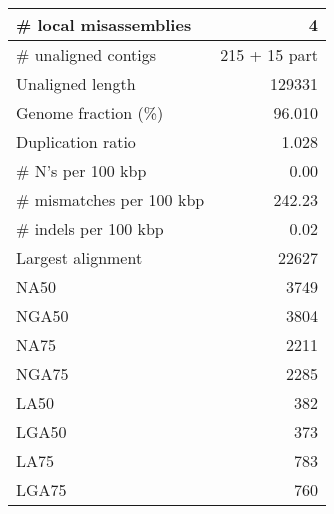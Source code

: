 \documentclass[12pt,a4paper]{article}
\begin{document}
\begin{table}[ht]
\begin{center}
\begin{tabular}{|l*{1}{|r}|}
\# local misassemblies & 4 \\ \hline
\# unaligned contigs & 215 + 15 part \\ \hline
Unaligned length & 129331 \\ \hline
Genome fraction (\%) & 96.010 \\ \hline
Duplication ratio & 1.028 \\ \hline
\# N's per 100 kbp & 0.00 \\ \hline
\# mismatches per 100 kbp & 242.23 \\ \hline
\# indels per 100 kbp & 0.02 \\ \hline
Largest alignment & 22627 \\ \hline
NA50 & 3749 \\ \hline
NGA50 & 3804 \\ \hline
NA75 & 2211 \\ \hline
NGA75 & 2285 \\ \hline
LA50 & 382 \\ \hline
LGA50 & 373 \\ \hline
LA75 & 783 \\ \hline
LGA75 & 760 \\ \hline
\end{tabular}
\end{center}
\end{table}
\end{document}
